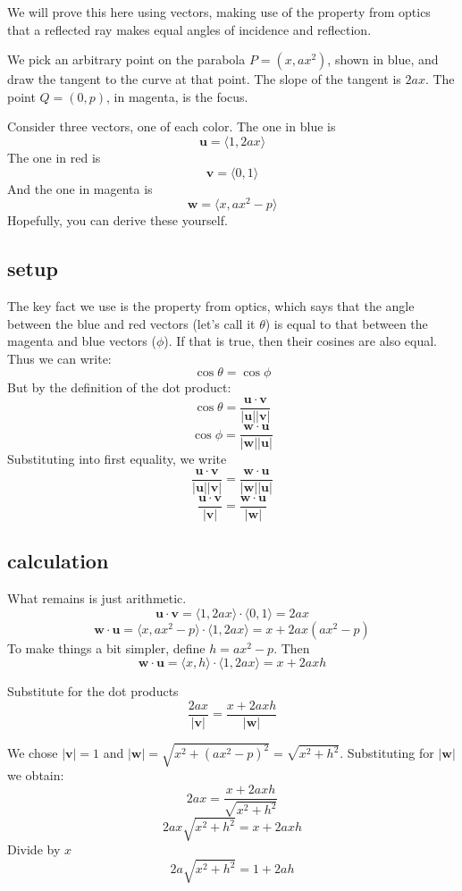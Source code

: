 \documentclass[11pt, oneside]{article}
\begin{document}
We will prove this here using vectors, making use of the property from optics that a reflected ray makes equal angles of incidence and reflection.

We pick an arbitrary point on the parabola $P = (x,ax^2)$, shown in blue, and draw the tangent to the curve at that point.  The slope of the tangent is $2ax$.  The point $Q = (0,p)$, in magenta, is the focus.

Consider three vectors, one of each color.  The one in blue is 
\[ \mathbf{u} = \langle 1, 2ax \rangle \]
The one in red is
\[ \mathbf{v} = \langle 0, 1 \rangle \]
And the one in magenta is 
\[ \mathbf{w} = \langle x, ax^2 - p \rangle \]
Hopefully, you can derive these yourself.

\subsection*{setup}
The key fact we use is the property from optics, which says that the angle between the blue and red vectors (let's call it $\theta$) is equal to that between the magenta and blue vectors ($\phi$).  If that is true, then their cosines are also equal.  Thus we can write:
\[ \cos \theta = \cos \phi \]
But by the definition of the dot product:
\[ \cos \theta = \frac{ \mathbf{u} \cdot \mathbf{v} }{ |\mathbf{u}| |\mathbf{v}|}
\]
\[ \cos \phi = \frac{ \mathbf{w} \cdot \mathbf{u} }{ |\mathbf{w}| |\mathbf{u}|}
\]
Substituting into first equality, we  write
\[ \frac{ \mathbf{u} \cdot \mathbf{v} }{ |\mathbf{u}| |\mathbf{v}|}
 = \frac{ \mathbf{w} \cdot \mathbf{u} }{ |\mathbf{w}| |\mathbf{u}|} \]
\[ \frac{ \mathbf{u} \cdot \mathbf{v} }{ |\mathbf{v}|}
 = \frac{ \mathbf{w} \cdot \mathbf{u} }{ |\mathbf{w}|} \]

\subsection*{calculation}
What remains is just arithmetic.
\[  \mathbf{u} \cdot \mathbf{v} = \langle 1, 2ax \rangle \cdot \langle 0, 1 \rangle = 2ax \]
\[  \mathbf{w} \cdot \mathbf{u} = \langle x, ax^2 - p \rangle \cdot \langle 1, 2ax \rangle = x + 2ax(ax^2 - p) \]
To make things a bit simpler, define $h = ax^2 - p$.  Then
\[  \mathbf{w} \cdot \mathbf{u} = \langle x, h \rangle \cdot \langle 1, 2ax \rangle = x + 2axh \]

Substitute for the dot products
\[ \frac{ 2ax}{ |\mathbf{v}|}
 = \frac{x + 2axh}{ |\mathbf{w}|} \]
 
We chose $| \mathbf{v} | = 1$ and $| \mathbf{w} | = \sqrt{x^2 + (ax^2 - p)^2} = \sqrt{x^2 + h^2}$.  Substituting for $|\mathbf{w}|$ we obtain:
\[ 2ax = \frac{x + 2axh}{\sqrt{x^2 + h^2}} \]
\[ 2ax \sqrt{x^2 + h^2} = x + 2axh \]
Divide by $x$
\[ 2a \sqrt{x^2 + h^2} = 1 + 2ah \]
\end{document}
